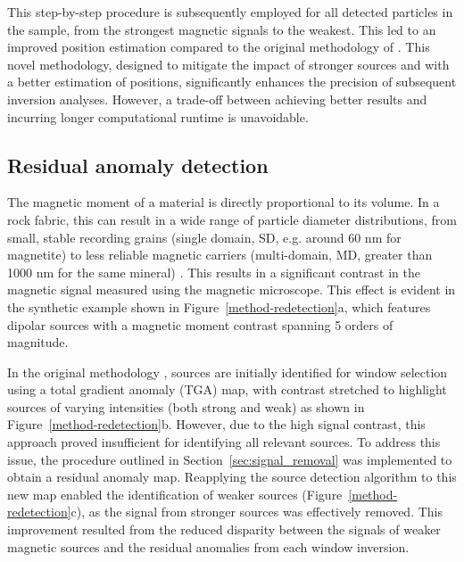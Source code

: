     This step-by-step procedure is subsequently employed for all detected particles in the sample, from the strongest magnetic signals to the weakest. This led to an improved position estimation compared to the original methodology of \citep{Souza-Junior2024}. This novel methodology, designed to mitigate the impact of stronger sources and with a better estimation of positions, significantly enhances the precision of subsequent inversion analyses. However, a trade-off between achieving better results and incurring longer computational runtime is unavoidable.

\subsection{Residual anomaly detection}

   The magnetic moment of a material is directly proportional to its volume. In a rock fabric, this can result in a wide range of particle diameter distributions, from small, stable recording grains (single domain, SD, e.g. around 60 nm for magnetite) to less reliable magnetic carriers (multi-domain, MD, greater than 1000 nm for the same mineral) \citep{Nagy2019}. This results in a significant contrast in the magnetic signal measured using the magnetic microscope. This effect is evident in the synthetic example shown in Figure~\ref{method-redetection}a, which features dipolar sources with a magnetic moment contrast spanning 5 orders of magnitude. 
   
    In the original methodology \citep{Souza-Junior2024}, sources are initially identified for window selection using a total gradient anomaly (TGA) map, with contrast stretched to highlight sources of varying intensities (both strong and weak) as shown in Figure~\ref{method-redetection}b. However, due to the high signal contrast, this approach proved insufficient for identifying all relevant sources. To address this issue, the procedure outlined in Section~\ref{sec:signal_removal} was implemented to obtain a residual anomaly map. Reapplying the source detection algorithm to this new map enabled the identification of weaker sources (Figure~\ref{method-redetection}c), as the signal from stronger sources was effectively removed. This improvement resulted from the reduced disparity between the signals of weaker magnetic sources and the residual anomalies from each window inversion.

